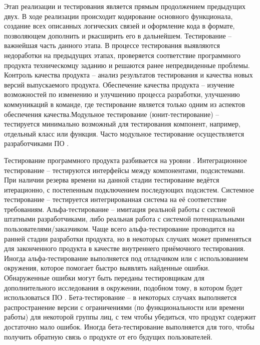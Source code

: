 Этап реализации и тестирования является прямым продолжением предыдущих двух. В ходе реализации происходит кодирование основного функционала, создание всех описанных логических связей и оформление кода в формате, позволяющем дополнить и ркасширить его в дальнейшем. Тестирование -- важнейшая часть данного этапа. В процессе тестирования выявляются недоработки на предыдущих этапах, проверяется соответствие программного продукта техническомцу заданию и решаются ранее непредвиденные проблемы. Контроль качества продукта -- анализ результатов тестирования и качества новых версий выпускаемого продукта. Обеспечение качества продукта -- изучение возможностей по изменению и улучшению процесса разработки, улучшению коммуникаций в команде, где тестирование является только одним из аспектов обеспечения качества.Модульное тестирование (юнит-тестирование) -- тестируется минимально возможный для тестирования компонент, например, отдельный класс или функция. Часто модульное тестирование осуществляется разработчиками ПО \cite{10, 12}.

Тестирование программного продукта разбивается на уровни \cite{2, 3}.
Интеграционное тестирование -- тестируются интерфейсы между компонентами, подсистемами. При наличии резерва времени на данной стадии тестирование ведётся итерационно, с постепенным подключением последующих подсистем.
Системное тестирование -- тестируется интегрированная система на её соответствие требованиям.
Альфа-тестирование -- имитация реальной работы с системой штатными разработчиками, либо реальная работа с системой потенциальными пользователями/заказчиком. Чаще всего альфа-тестирование проводится на ранней стадии разработки продукта, но в некоторых случаях может применяться для законченного продукта в качестве внутреннего приёмочного тестирования. Иногда альфа-тестирование выполняется под отладчиком или с использованием окружения, которое помогает быстро выявлять найденные ошибки. Обнаруженные ошибки могут быть переданы тестировщикам для дополнительного исследования в окружении, подобном тому, в котором будет использоваться ПО \cite{5, 7}.
Бета-тестирование -- в некоторых случаях выполняется распространение версии с ограничениями (по функциональности или времени работы) для некоторой группы лиц, с тем чтобы убедиться, что продукт содержит достаточно мало ошибок. Иногда бета-тестирование выполняется для того, чтобы получить обратную связь о продукте от его будущих пользователей.